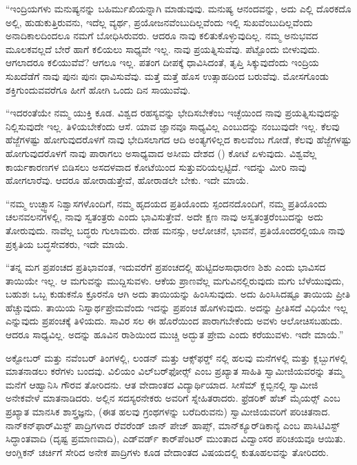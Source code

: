 \vskip 2pt

 “ಇಂದ್ರಿಯಗಳು ಮನುಷ್ಯನನ್ನು ಬಹಿರ್ಮುಖಿಯನ್ನಾಗಿ ಮಾಡುವುವು. ಮನುಷ್ಯ ಆನಂದವನ್ನು, ಅದು ಎಲ್ಲಿ ದೊರಕದೊ ಅಲ್ಲಿ, ಹುಡುಕುತ್ತಿರುವನು, ಇದೆಲ್ಲ ವ್ಯರ್ಥ, ಪ್ರಯೋಜನವೆಂಬುದಿಲ್ಲವೆಂದು ಇಲ್ಲಿ ಸುಖವೆಂಬುದಿಲ್ಲವೆಂದು ಅನಾದಿಕಾಲದಿಂದಲೂ ನಮಗೆ ಬೋಧಿಸಿರುವರು. ಆದರೂ ನಾವು ಕಲಿತುಕೊಳ್ಳುವುದಿಲ್ಲ. ನಮ್ಮ ಅನುಭವದ ಮೂಲಕವಲ್ಲದೆ ಬೇರೆ ಹಾಗೆ ಕಲಿಯಲು ಸಾಧ್ಯವೇ ಇಲ್ಲ. ನಾವು ಪ್ರಯತ್ನಿಸುವೆವು. ಪೆಟ್ಟೊಂದು ಬೀಳುವುದು. ಆಗಲಾದರೂ ಕಲಿಯುವೆವೆ? ಆಗಲೂ ಇಲ್ಲ. ಪತಂಗ ದೀಪಕ್ಕೆ ಧಾವಿಸಿದಂತೆ, ತೃಪ್ತಿ ಸಿಕ್ಕುವುದೆಂದು ಇಂದ್ರಿಯ ಸುಖದೆಡೆಗೆ ನಾವು ಪುನಃ ಪುನಃ ಧಾವಿಸುವೆವು. ಮತ್ತೆ ಮತ್ತೆ ಹೊಸ ಉತ್ಸಾಹದಿಂದ ಬರುವೆವು. ಮೋಸಗೊಂಡು ಶಕ್ತಿಗುಂದುವವರೆಗೂ ಹೀಗೆ ಹೋಗಿ ಒಂದು ದಿನ ಸಾಯುವೆವು.

\vskip 2pt

 “ಇದರಂತೆಯೇ ನಮ್ಮ ಯುಕ್ತಿ ಕೂಡ. ವಿಶ್ವದ ರಹಸ್ಯವನ್ನು ಭೇದಿಸಬೇಕೆಂಬ ಇಚ್ಛೆಯಿಂದ ನಾವು ಪ್ರಯತ್ನಿಸುವುದನ್ನು ನಿಲ್ಲಿಸುವುದೇ ಇಲ್ಲ. ತಿಳಿಯಬೇಕೆಂದು ಆಸೆ. ಯಾವ ಜ್ಞಾನವೂ ಸಾಧ್ಯವಿಲ್ಲ ಎಂಬುದನ್ನು ನಂಬುವುದೇ ಇಲ್ಲ. ಕೆಲವು ಹೆಜ್ಜೆಗಳಷ್ಟು ಹೋಗುವುದರೊಳಗೆ ನಾವು ಭೇದಿಸಲಾಗದ ಆದಿ ಅಂತ್ಯಗಳಿಲ್ಲದ ಕಾಲವೆಂಬ ಗೋಡೆ, ಕೆಲವು ಹೆಜ್ಜೆಗಳಷ್ಟು ಹೋಗುವುದರೊಳಗೆ ನಾವು ಪಾರಾಗಲು ಅಸಾಧ್ಯವಾದ ಅಸೀಮ ದೇಶದ () ಕೋಟೆ ಏಳುವುದು. ವಿಶ್ವವೆಲ್ಲ ಕಾರ್ಯಕಾರಣಗಳ ಬಿಡಿಸಲು ಅಸದಳವಾದ ಕೋಟೆಯಿಂದ ಸುತ್ತುವರಿಯಲ್ಪಟ್ಟಿದೆ. ಇದನ್ನು ಮೀರಿ ನಾವು ಹೋಗಲಾರೆವು. ಆದರೂ ಹೋರಾಡುತ್ತೇವೆ, ಹೋರಾಡಲೇ ಬೇಕು. ಇದೇ ಮಾಯೆ.

\vskip 2pt

 “ನಮ್ಮ ಉಚ್ಛ್ವಾಸ ನಿಶ್ವಾಸಗಳೊಂದಿಗೆ, ನಮ್ಮ ಹೃದಯದ ಪ್ರತಿಯೊಂದು ಸ್ಪಂದನದೊಂದಿಗೆ, ನಮ್ಮ ಪ್ರತಿಯೊಂದು ಚಲನವಲನಗಳಲ್ಲಿ, ನಾವು ಸ್ವತಂತ್ರರು ಎಂದು ಭಾವಿಸುತ್ತೇವೆ. ಅದೇ ಕ್ಷಣ ನಾವು ಅಸ್ವತಂತ್ರರೆಂಬುದನ್ನು ಅದು ತೋರುವುದು. ನಾವೆಲ್ಲ ಬದ್ಧರು ಗುಲಾಮರು. ದೇಹ ಮನಸ್ಸು, ಆಲೋಚನೆ, ಭಾವನೆ, ಪ್ರತಿಯೊಂದರಲ್ಲಿಯೂ ನಾವು ಪ್ರಕೃತಿಯ ಬದ್ಧಸೇವಕರು, ಇದೇ ಮಾಯೆ.

\vskip 2pt

 “ತನ್ನ ಮಗ ಪ್ರಪಂಚದ ಪ್ರತಿಭಾವಂತ, ಇದುವರೆಗೆ ಪ್ರಪಂಚದಲ್ಲಿ ಹುಟ್ಟಿದ\break ಅಸಾಧಾರಣ ಶಿಶು ಎಂದು ಭಾವಿಸದ ತಾಯಿಯೇ ಇಲ್ಲ. ಆ ಮಗುವನ್ನು ಮುದ್ದಿಸುವಳು. ಆಕೆಯ ಪ್ರಾಣವೆಲ್ಲ ಮಗುವಿನಲ್ಲಿರುವುದು ಮಗು ಬೆಳೆಯುವುದು, ಬಹುಶಃ ಒಬ್ಬ ಕುಡುಕನೊ ಕ್ರೂರನೊ ಆಗಿ ಅದು ತಾಯಿಯನ್ನು ಹಿಂಸಿಸುವುದು. ಅದು ಹಿಂಸಿಸಿದಷ್ಟೂ ತಾಯಿಯ ಪ್ರೀತಿ ಹೆಚ್ಚುವುದು. ತಾಯಿಯ ನಿಸ್ವಾರ್ಥಪ್ರೇಮವೆಂದು ಇದನ್ನು ಪ್ರಪಂಚ ಹೊಗಳುವುದು. ಅದನ್ನು ಪ್ರೀತಿಸದೆ ವಿಧಿಯೇ ಇಲ್ಲ ಎನ್ನುವುದು ಪ್ರಪಂಚಕ್ಕೆ ತಿಳಿಯದು. ಸಾವಿರ ಸಲ ಈ ಹೊರೆಯಿಂದ ಪಾರಾಗಬೇಕೆಂದು ಅವಳು ಆಲೋಚಿಸಬಹುದು. ಆದರೂ ಸಾಧ್ಯವಿಲ್ಲ. ಅದನ್ನು ಹೂವಿನ ರಾಶಿಯಿಂದ ಮುಚ್ಚಿ ಅದ್ಭುತ ಪ್ರೇಮ ಎಂದು ಕರೆಯುವಳು. ಇದೇ ಮಾಯೆ.” 

\vskip 2pt

 ಅಕ್ಟೋಬರ್ ಮತ್ತು ನವೆಂಬರ್ ತಿಂಗಳಲ್ಲಿ, ಲಂಡನ್ ಮತ್ತು ಆಕ್ಸ್‌ಫರ್ಡ್‍ ನಲ್ಲಿ ಹಲವು ಮನೆಗಳಲ್ಲಿ ಮತ್ತು ಕ್ಲಬ್ಬುಗಳಲ್ಲಿ ಮಾತನಾಡಲು ಕರೆಗಳು ಬಂದವು. ವಿಲಿಯಂ ವಿಲ್‌ಬರ್‌ಫೋರ್ಸ್‍ ಎಂಬ ಪ್ರಖ್ಯಾತ ಸಾಹಿತಿ ಸ್ವಾಮೀಜಿಯವರನ್ನು ತಮ್ಮ ಮನೆಗೆ ಆಹ್ವಾನಿಸಿ ಗೌರವ ತೋರಿದನು. ಆತ ವೇದಾಂತದ ವಿದ್ಯಾರ್ಥಿಯಾದ. ಸೀಸೆಮ್ ಕ್ಲಬ್ಬಿನಲ್ಲಿ ಸ್ವಾಮೀಜಿ ಅನೇಕವೇಳೆ ಮಾತನಾಡಿದರು. ಅಲ್ಲಿನ ಸದಸ್ಯರನೇಕರು ಅವರಿಗೆ ಸ್ನೇಹಿತರಾದರು. ಫ್ರೆಡರಿಕ್ ಹೆಚ್ ಮೈಯರ್ಸ್‍ ಎಂಬ ಪ್ರಖ್ಯಾತ ಮಾನಸಿಕ ಶಾಸ್ತ್ರಜ್ಞನು, (ಈತ ಹಲವು ಗ್ರಂಥಗಳನ್ನು ಬರೆದಿರುವನು) ಸ್ವಾಮೀಜಿಯವರಿಗೆ ಪರಿಚಿತನಾದ. ನಾನ್‌ಕನ್‌ಫಾರ್‌ಮಿಸ್ಟ್ ಪಾದ್ರಿಗಳಾದ ರೆವರೆಂಡ್ ಜಾನ್ ಪೇಜ್ ಹಾಪ್ಸ್, ಮಾನ್‌ಕ್ಯೂರ್‌ಡಿಕಾನ್ಯೆ ಎಂಬ ಪಾಸಿಟಿವಿಸ್ಟ್ ಸಿದ್ಧಾಂತವಾದಿ (ದೃಷ್ಟ ಪ್ರಮಾಣವಾದಿ), ಎಡ್‌ವರ್ಡ್ ಕಾರ್‌ಪೆಂಟರ್ ಮುಂತಾದ ವಿದ್ವಾಂಸರ ಪರಿಚಯವೂ ಆಯಿತು. ಆಂಗ್ಲಿಕನ್ ಚರ್ಚಿಗೆ ಸೇರಿದ ಅನೇಕ ಪಾದ್ರಿಗಳು ಕೂಡ ವೇದಾಂತದ ವಿಷಯದಲ್ಲಿ ಕುತೂಹಲವನ್ನು ತೋರಿದರು. 

